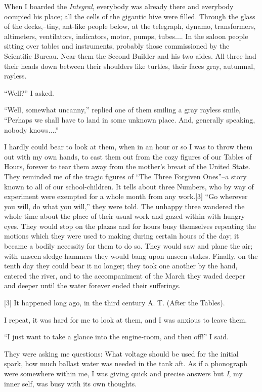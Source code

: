 \documentclass[11pt,openany]{book}
\begin{document}
When I boarded the \emph{Integral}, everybody was already there and everybody occupied his place; all the cells of the gigantic hive were filled. Through the glass of the decks,--tiny, ant-like people below, at the telegraph, dynamo, transformers, altimeters, ventilators, indicators, motor, pumps, tubes.... In the saloon people sitting over tables and instruments, probably those commissioned by the Scientific Bureau. Near them the Second Builder and his two aides. All three had their heads down between their shoulders like turtles, their faces gray, autumnal, rayless.

``Well?'' I asked.

``Well, somewhat uncanny,'' replied one of them smiling a gray rayless smile, ``Perhaps we shall have to land in some unknown place. And, generally speaking, nobody knows....''

I hardly could bear to look at them, when in an hour or so I was to throw them out with my own hands, to cast them out from the cozy figures of our Tables of Hours, forever to tear them away from the mother's breast of the United State. They reminded me of the tragic figures of ``The Three Forgiven Ones''--a story known to all of our school-children. It tells about three Numbers, who by way of experiment were exempted for a whole month from any work.[3] ``Go wherever you will, do what you will,'' they were told. The unhappy three wandered the whole time about the place of their usual work and gazed within with hungry eyes. They would stop on the plazas and for hours busy themselves repeating the motions which they were used to making during certain hours of the day; it became a bodily necessity for them to do so. They would saw and plane the air; with unseen sledge-hammers they would bang upon unseen stakes. Finally, on the tenth day they could bear it no longer; they took one another by the hand, entered the river, and to the accompaniment of the March they waded deeper and deeper until the water forever ended their sufferings.

[3] It happened long ago, in the third century A. T. (After the Tables).

I repeat, it was hard for me to look at them, and I was anxious to leave them.

``I just want to take a glance into the engine-room, and then off!'' I said.

They were asking me questions: What voltage should be used for the initial spark, how much ballast water was needed in the tank aft. As if a phonograph were somewhere within me, I was giving quick and precise answers but \emph{I}, my inner self, was busy with its own thoughts.
\end{document}
